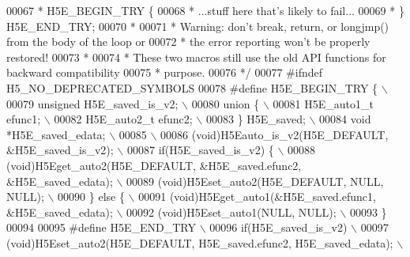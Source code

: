 \begin{DoxyCode}
00067 \textcolor{comment}{ *  H5E\_BEGIN\_TRY \{}
00068 \textcolor{comment}{ *      ...stuff here that's likely to fail...}
00069 \textcolor{comment}{ *      \} H5E\_END\_TRY;}
00070 \textcolor{comment}{ *}
00071 \textcolor{comment}{ * Warning: don't break, return, or longjmp() from the body of the loop or}
00072 \textcolor{comment}{ *      the error reporting won't be properly restored!}
00073 \textcolor{comment}{ *}
00074 \textcolor{comment}{ * These two macros still use the old API functions for backward compatibility}
00075 \textcolor{comment}{ * purpose.}
00076 \textcolor{comment}{ */}
00077 \textcolor{preprocessor}{#ifndef H5\_NO\_DEPRECATED\_SYMBOLS}
00078 \textcolor{preprocessor}{#define H5E\_BEGIN\_TRY \{                               \(\backslash\)}
00079 \textcolor{preprocessor}{    unsigned H5E\_saved\_is\_v2;                                 \(\backslash\)}
00080 \textcolor{preprocessor}{    union \{                                   \(\backslash\)}
00081 \textcolor{preprocessor}{        H5E\_auto1\_t efunc1;                           \(\backslash\)}
00082 \textcolor{preprocessor}{        H5E\_auto2\_t efunc2;                               \(\backslash\)}
00083 \textcolor{preprocessor}{    \} H5E\_saved;                                  \(\backslash\)}
00084 \textcolor{preprocessor}{    void *H5E\_saved\_edata;                            \(\backslash\)}
00085 \textcolor{preprocessor}{                                              \(\backslash\)}
00086 \textcolor{preprocessor}{    (void)H5Eauto\_is\_v2(H5E\_DEFAULT, &H5E\_saved\_is\_v2);                   \(\backslash\)}
00087 \textcolor{preprocessor}{    if(H5E\_saved\_is\_v2) \{                             \(\backslash\)}
00088 \textcolor{preprocessor}{        (void)H5Eget\_auto2(H5E\_DEFAULT, &H5E\_saved.efunc2, &H5E\_saved\_edata); \(\backslash\)}
00089 \textcolor{preprocessor}{        (void)H5Eset\_auto2(H5E\_DEFAULT, NULL, NULL);                      \(\backslash\)}
00090 \textcolor{preprocessor}{    \} else \{                                      \(\backslash\)}
00091 \textcolor{preprocessor}{        (void)H5Eget\_auto1(&H5E\_saved.efunc1, &H5E\_saved\_edata);              \(\backslash\)}
00092 \textcolor{preprocessor}{        (void)H5Eset\_auto1(NULL, NULL);                       \(\backslash\)}
00093 \textcolor{preprocessor}{    \}}
00094 
00095 \textcolor{preprocessor}{#define H5E\_END\_TRY                               \(\backslash\)}
00096 \textcolor{preprocessor}{    if(H5E\_saved\_is\_v2)                               \(\backslash\)}
00097 \textcolor{preprocessor}{        (void)H5Eset\_auto2(H5E\_DEFAULT, H5E\_saved.efunc2, H5E\_saved\_edata);   \(\backslash\)}

\end{DoxyCode}
